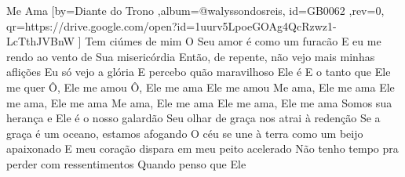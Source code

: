 \beginsong
{Me Ama %
}[by={Diante do Trono %
},album={@walyssondosreis},
id={GB0062 %
},rev={0}, %
qr={https://drive.google.com/open?id=1uurv5LpoeGOAg4QcRzwz1-LcTthJVBnW %
}]
\beginverse*
Tem ciúmes de mim
O Seu amor é como um furacão
E eu me rendo ao vento de Sua misericórdia
Então, de repente, não vejo mais minhas aflições
Eu só vejo a glória
E percebo quão maravilhoso Ele é
E o tanto que Ele me quer
\endverse
\beginverse*
Ô, Ele me amou
Ô, Ele me ama
Ele me amou
\endverse
\beginchorus
Me ama, Ele me ama
Ele me ama, Ele me ama
Me ama, Ele me ama
Ele me ama, Ele me ama
\endchorus
\beginverse*
Somos sua herança e Ele é o nosso galardão
Seu olhar de graça nos atrai à redenção
Se a graça é um oceano, estamos afogando
O céu se une à terra como um beijo apaixonado
E meu coração dispara em meu peito acelerado
Não tenho tempo pra perder com ressentimentos
Quando penso que Ele
\endverse

\begin{comment}
\lstset{basicstyle=\scriptsize\bf} %
\tab{Solo 1}
\begin{lstlisting}
E|-----------------------------------------------------|
B|-----------------------------------------------------|
G|-----------------------------------------------------|
D|-----------------------------------------------------|
A|-----------------------------------------------------|
E|-----------------------------------------------------|
\end{lstlisting}
\end{comment}
 
